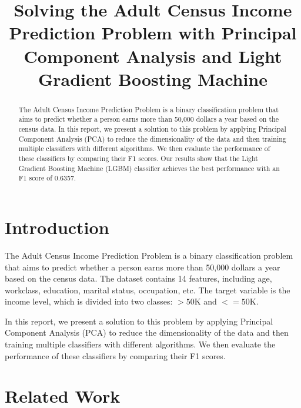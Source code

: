 \documentclass[conference]{IEEEtran}
\begin{document}
\title{Solving the Adult Census Income Prediction Problem with Principal Component Analysis and Light Gradient Boosting Machine}

\author{
}

\maketitle

\begin{abstract}
    The Adult Census Income Prediction Problem is a binary classification problem that aims to predict whether a person earns more than 50,000 dollars a year based on the census data.
    In this report, we present a solution to this problem by applying Principal Component Analysis (PCA) to reduce the dimensionality of the data and then training multiple classifiers with different algorithms.
    We then evaluate the performance of these classifiers by comparing their F1 scores.
    Our results show that the Light Gradient Boosting Machine (LGBM) classifier achieves the best performance with an F1 score of 0.6357.
\end{abstract}

\section{Introduction}

The Adult Census Income Prediction Problem is a binary classification problem that aims to predict whether a person earns more than 50,000 dollars a year based on the census data.
The dataset contains 14 features, including age, workclass, education, marital status, occupation, etc.
The target variable is the income level, which is divided into two classes: $>50$K and $<=50$K.

In this report, we present a solution to this problem by applying Principal Component Analysis (PCA) to reduce the dimensionality of the data and then training multiple classifiers with different algorithms.
We then evaluate the performance of these classifiers by comparing their F1 scores.

\section{Related Work}
\end{document}
